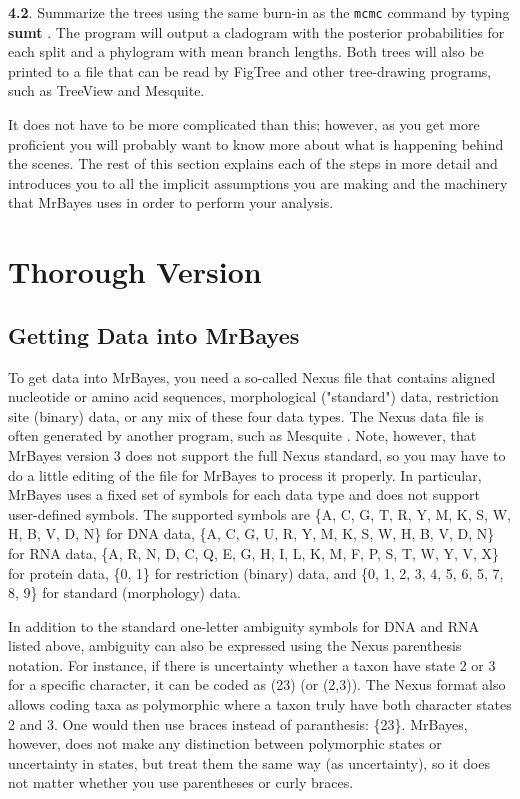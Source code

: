 \documentclass[12pt]{book}
\begin{document}
\textbf{4.2}. Summarize the trees using the same burn-in as the \texttt{mcmc} command by typing \textbf{sumt}
. The program will output a cladogram with the posterior probabilities for each split and a phylogram with
 mean branch lengths. Both trees will also be printed to a file that can be read by FigTree and other
 tree-drawing programs, such as TreeView and Mesquite.

It does not have to be more complicated than this; however, as you get more proficient you will probably
 want to know more about what is happening behind the scenes. The rest of this section explains each of
 the steps in more detail and introduces you to all the implicit assumptions you are making and the
 machinery that MrBayes uses in order to perform your analysis.

\section{Thorough Version}

\subsection{Getting Data into MrBayes}
To get data into MrBayes, you need a so-called Nexus file that contains aligned nucleotide or amino acid 
sequences, morphological ("standard") data, restriction site (binary) data, or any mix of these four data
 types. The Nexus data file is often generated by another program, such as Mesquite \citep{Maddison06}.
 Note, however, that MrBayes version 3 does not support the full Nexus standard, so you may have to do 
 a little editing of the file for MrBayes to process it properly. In particular, MrBayes uses a fixed
 set of symbols for each data type and does not support user-defined symbols. The supported symbols are 
 \{A, C, G, T, R, Y, M, K, S, W, H, B, V, D, N\} for DNA data, 
 \{A, C, G, U, R, Y, M, K, S, W, H, B, V, D, N\} for RNA data, 
 \{A, R, N, D, C, Q, E, G, H, I, L, K, M, F, P, S, T, W, Y, V, X\} for protein data, \{0, 1\} for 
 restriction (binary) data, and \{0, 1, 2, 3, 4, 5, 6, 5, 7, 8, 9\} for standard (morphology) data. 

 In addition to the standard one-letter ambiguity symbols for DNA and RNA listed above, ambiguity can also
 be expressed using the Nexus parenthesis notation. For instance, if there is uncertainty whether a taxon
 have state 2 or 3 for a specific character, it can be coded as (23) (or (2,3)). The Nexus format also
 allows coding taxa as polymorphic \textemdash where a taxon truly have both character states 2 and 3.
 One would then use braces instead of paranthesis: \{23\}. MrBayes, however, does not make any distinction
 between polymorphic states or uncertainty in states, but treat them the same way (as uncertainty), so 
 it does not matter whether you use parentheses or curly braces.
 
\end{document}
